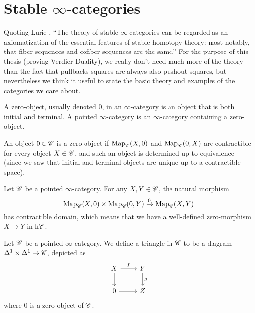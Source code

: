 \documentclass[../../thesis.tex]{subfiles}
\begin{document}
\section{Stable $\infty$-categories}
Quoting Lurie \cite{HA}, ``The theory of stable $\infty$-categories can be regarded as an axiomatization of the essential features of stable homotopy theory: most notably, that fiber sequences and cofiber sequences are the same.''
For the purpose of this thesis (proving Verdier Duality), we really don't need much more of the theory than the fact that pullbacks squares are always also pushout squares, but nevertheless we think it useful to state the basic theory and examples of the categories we care about.
\begin{definition}[{\cite[Definition 1.1.1.1.]{HA}}]
    A zero-object, usually denoted $0$, in an $\infty$-category is an object that is both initial and terminal.
    A pointed $\infty$-category is an $\infty$-category containing a zero-object.
\end{definition}
\begin{remark}
    An object $0\in \mathscr{C}$ is a zero-object if $\mathrm{Map}_{\mathscr{C}}(X,0)$ and $\mathrm{Map}_{\mathscr{C}}(0,X)$ are contractible for every object $X\in \mathscr{C}$, and such an object is determined up to equivalence (since we saw that initial and terminal objects are unique up to a contractible space).
\end{remark}
\begin{remark}[{\cite[Remark 1.1.1.3.]{HA}}]
    Let $\mathscr{C}$ be a pointed $\infty$-category.
    For any $X,Y \in \mathscr{C}$, the natural morphism
    \[
        \mathrm{Map}_{\mathscr{C}}(X, 0) \times \mathrm{Map}_{\mathscr{C}}(0, Y) \xrightarrow{0} \mathrm{Map}_{\mathscr{C}}(X,Y)
    \]
    has contractible domain, which means that we have a well-defined zero-morphism $X\to Y$ in $\mathrm{h}\mathscr{C}$.
\end{remark}
\begin{definition}[{\cite[Definition 1.1.1.4.]{HA}}]
    Let $\mathscr{C}$ be a pointed $\infty$-category.
    We define a triangle in $\mathscr{C}$ to be a diagram $\Delta^1 \times \Delta^1 \to \mathscr{C}$, depicted as
    \begin{equation}\label{triangle}\begin{tikzcd}
            X & Y \\
            0 & Z
            \arrow["f", from=1-1, to=1-2]
            \arrow[from=2-1, to=2-2]
            \arrow["g", from=1-2, to=2-2]
            \arrow[from=1-1, to=2-1]
        \end{tikzcd}\end{equation}
    where $0$ is a zero-object of $\mathscr{C}$.
\end{definition}
\end{document}

